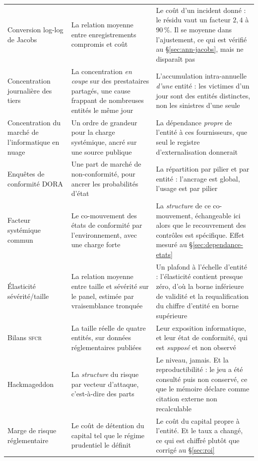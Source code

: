 {\begin{longtable}{@{}>{\raggedright\arraybackslash}p{3.1cm}
                    >{\raggedright\arraybackslash}p{5.4cm}
                    >{\raggedright\arraybackslash}p{5.6cm}@{}}
Conversion log-log de Jacobs &
La relation moyenne entre enregistrements compromis et coût &
Le coût d'un incident donné : le résidu vaut un facteur $2{,}4$ à $90\,\%$. Il se moyenne dans
l'ajustement, ce qui est vérifié au \S\ref{sec:ann-jacobs}, mais ne disparaît pas \\

Concentration journalière des tiers &
La concentration \emph{en coupe} sur des prestataires partagés, une cause frappant de nombreuses
entités le même jour &
L'accumulation intra-annuelle \emph{d'une} entité : les victimes d'un jour sont des entités
distinctes, non les sinistres d'une seule \\

Concentration du marché de l'informatique en nuage &
Un ordre de grandeur pour la charge systémique, ancré sur une source publique &
La dépendance \emph{propre} de l'entité à ces fournisseurs, que seul le registre
d'externalisation donnerait \\

Enquêtes de conformité DORA &
Une part de marché de non-conformité, pour ancrer les probabilités d'état &
La répartition par pilier et par entité : l'ancrage est global, l'usage est par pilier \\

Facteur systémique commun &
Le co-mouvement des états de conformité par l'environnement, avec une charge forte &
La \emph{structure} de ce co-mouvement, échangeable ici alors que le recouvrement des contrôles
est spécifique. Effet mesuré au \S\ref{sec:dependance-etats} \\

Élasticité sévérité/taille &
La relation moyenne entre taille et sévérité sur le panel, estimée par vraisemblance tronquée &
Un plafond à l'échelle d'entité : l'élasticité contient presque zéro, d'où la borne inférieure
de validité et la requalification du chiffre d'entité en borne supérieure \\

Bilans \textsc{sfcr} &
La taille réelle de quatre entités, sur données réglementaires publiées &
Leur exposition informatique, et leur état de conformité, qui est \emph{supposé} et non observé \\

Hackmageddon &
La \emph{structure} du risque par vecteur d'attaque, c'est-à-dire des parts &
Le niveau, jamais. Et la reproductibilité : le jeu a été consulté puis non conservé, ce que le
mémoire déclare comme citation externe non recalculable \\

Marge de risque réglementaire &
Le coût de détention du capital tel que le régime prudentiel le définit &
Le coût du capital propre à l'entité. Et le taux a changé, ce qui est chiffré plutôt que
corrigé au \S\ref{sec:roi} \\
\end{longtable}
}

